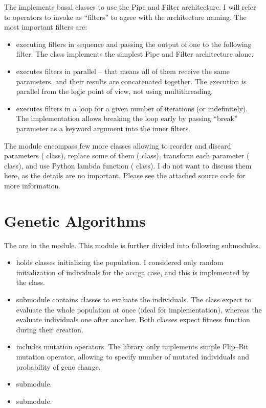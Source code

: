 The  implements basal classes to use the Pipe and Filter architecture. I will refer to operators to invoke as \enquote{filters} to agree with the architecture naming. The most important filters are:
\begin{itemize}
    \item {} executing filters in sequence and passing the output of one to the following filter. The  class implements the simplest Pipe and Filter architecture alone.
    \item {} executes filters in parallel -- that means all of them receive the same parameters, and their results are concatenated together. The execution is parallel from the logic point of view, not using multithreading.
    \item {} executes filters in a loop for a given number of iterations (or indefinitely). The implementation allows breaking the loop early by passing \enquote{break} parameter as a keyword argument into the inner filters.
\end{itemize}
The module encompass few more classes allowing to reorder and discard parameters ( class), replace some of them ( class), transform each parameter ( class), and use Python lambda function ( class). I do not want to discuss them here, as the details are no important. Please see the attached source code for more information.




\section{Genetic Algorithms}

The  are in the  module. This module is further divided into following submodules.
\begin{itemize}
    \item {} holds classes initializing the population. I considered only random initialization of individuals for the \acrshort{acc:ga} case, and this is implemented by the  class.
    \item {} submodule contains classes to evaluate the individuals. The  class expect to evaluate the whole population at once (ideal for \gpu implementation), whereas the  evaluate individuals one after another. Both classes expect fitness function during their creation.
    \item {} includes mutation operators. The library only implements simple Flip--Bit mutation operator, allowing to specify number of mutated individuals and probability of gene change.
    \item {} submodule.
    \item {} submodule.
\end{itemize}

